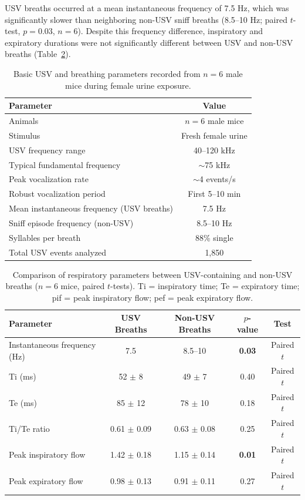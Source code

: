 \documentclass[11pt]{article}
\begin{document}
USV breaths occurred at a mean instantaneous frequency of 7.5 Hz, which was significantly slower than neighboring non-USV sniff breaths (8.5--10 Hz; paired $t$-test, $p = 0.03$, $n = 6$). Despite this frequency difference, inspiratory and expiratory durations were not significantly different between USV and non-USV breaths (Table~\ref{tab:breath_comparison}).

\begin{table}[H]
\centering
\caption{Basic USV and breathing parameters recorded from $n = 6$ male mice during female urine exposure.}
\label{tab:basic_params}
\begin{tabular}{lc}
\toprule
\textbf{Parameter} & \textbf{Value} \\
\midrule
Animals & $n = 6$ male mice \\
Stimulus & Fresh female urine \\
USV frequency range & 40--120 kHz \\
Typical fundamental frequency & $\sim$75 kHz \\
Peak vocalization rate & $\sim$4 events/s \\
Robust vocalization period & First 5--10 min \\
Mean instantaneous frequency (USV breaths) & 7.5 Hz \\
Sniff episode frequency (non-USV) & 8.5--10 Hz \\
Syllables per breath & 88\% single \\
Total USV events analyzed & 1,850 \\
\bottomrule
\end{tabular}
\end{table}

\begin{table}[H]
\centering
\caption{Comparison of respiratory parameters between USV-containing and non-USV breaths ($n = 6$ mice, paired $t$-tests). Ti = inspiratory time; Te = expiratory time; pif = peak inspiratory flow; pef = peak expiratory flow.}
\label{tab:breath_comparison}
\begin{tabular}{lcccc}
\toprule
\textbf{Parameter} & \textbf{USV Breaths} & \textbf{Non-USV Breaths} & \textbf{$p$-value} & \textbf{Test} \\
\midrule
Instantaneous frequency (Hz) & 7.5 & 8.5--10 & \textbf{0.03} & Paired $t$ \\
Ti (ms) & 52 $\pm$ 8 & 49 $\pm$ 7 & 0.40 & Paired $t$ \\
Te (ms) & 85 $\pm$ 12 & 78 $\pm$ 10 & 0.18 & Paired $t$ \\
Ti/Te ratio & 0.61 $\pm$ 0.09 & 0.63 $\pm$ 0.08 & 0.25 & Paired $t$ \\
Peak inspiratory flow & 1.42 $\pm$ 0.18 & 1.15 $\pm$ 0.14 & \textbf{0.01} & Paired $t$ \\
Peak expiratory flow & 0.98 $\pm$ 0.13 & 0.91 $\pm$ 0.11 & 0.27 & Paired $t$ \\
\bottomrule
\end{tabular}
\end{table}
\end{document}
